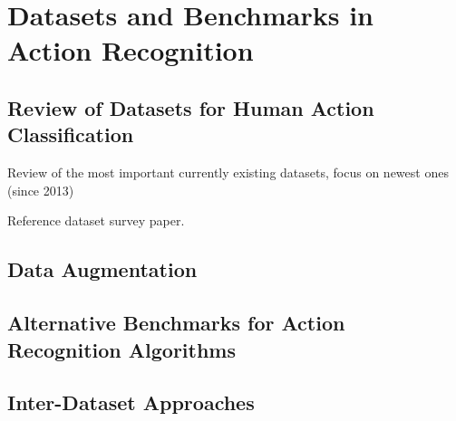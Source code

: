 \section{Datasets and Benchmarks in Action Recognition}

\subsection{Review of Datasets for Human Action Classification}
Review of the most important currently existing datasets, focus on newest ones (since 2013)

Reference dataset survey paper.

\subsection{Data Augmentation}

\subsection{Alternative Benchmarks for Action Recognition Algorithms}

\subsection{Inter-Dataset Approaches}

